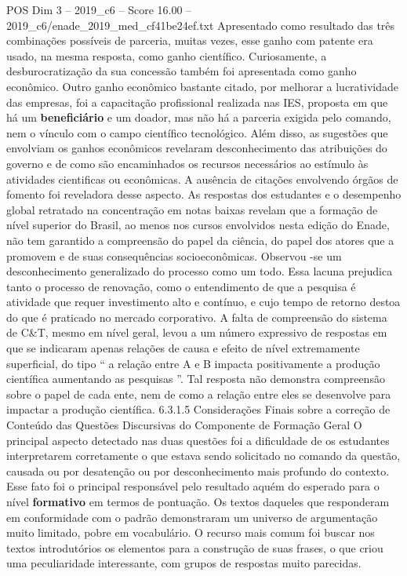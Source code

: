 \begin{textsample}{POS Dim 3 – 2019\_c6 – Score 16.00 – 2019\_c6/enade\_2019\_med\_cf41be24ef.txt}
Apresentado como resultado das três combinações possíveis de parceria, muitas vezes, esse ganho com patente era usado, na mesma resposta, como ganho científico.
Curiosamente, a desburocratização da sua concessão também foi apresentada como ganho econômico.
Outro ganho econômico bastante citado, por melhorar a lucratividade das empresas, foi a capacitação profissional realizada nas IES, proposta em que há um \textbf{beneficiário} e um doador, mas não há a parceria exigida pelo comando, nem o vínculo com o campo científico tecnológico.
Além disso, as sugestões que envolviam os ganhos econômicos revelaram desconhecimento das atribuições do governo e de como são encaminhados os recursos necessários ao estímulo às atividades cientificas ou econômicas.
A ausência de citações envolvendo órgãos de fomento foi reveladora desse aspecto.
As respostas dos estudantes e o desempenho global retratado na concentração em notas baixas revelam que a formação de nível superior do Brasil, ao menos nos cursos envolvidos nesta edição do Enade, não tem garantido a compreensão do papel da ciência, do papel dos atores que a promovem e de suas consequências socioeconômicas.
Observou -se um desconhecimento generalizado do processo como um todo.
Essa lacuna prejudica tanto o processo de renovação, como o entendimento de que a pesquisa é atividade que requer investimento alto e contínuo, e cujo tempo de retorno destoa do que é praticado no mercado corporativo.
A falta de compreensão do sistema de C\&T, mesmo em nível geral, levou a um número expressivo de respostas em que se indicaram apenas relações de causa e efeito de nível extremamente superficial, do tipo “ a relação entre A e B impacta positivamente a produção científica aumentando as pesquisas ”.
Tal resposta não demonstra compreensão sobre o papel de cada ente, nem de como a relação entre eles se desenvolve para impactar a produção científica. 6.3.1.5 Considerações Finais sobre a correção de Conteúdo das Questões Discursivas do Componente de Formação Geral O principal aspecto detectado nas duas questões foi a dificuldade de os estudantes interpretarem corretamente o que estava sendo solicitado no comando da questão, causada ou por desatenção ou por desconhecimento mais profundo do contexto.
Esse fato foi o principal responsável pelo resultado aquém do esperado para o nível \textbf{formativo} em termos de pontuação.
Os textos daqueles que responderam em conformidade com o padrão demonstraram um universo de argumentação muito limitado, pobre em vocabulário.
O recurso mais comum foi buscar nos textos introdutórios os elementos para a construção de suas frases, o que criou uma peculiaridade interessante, com grupos de respostas muito parecidas.

\end{textsample}
